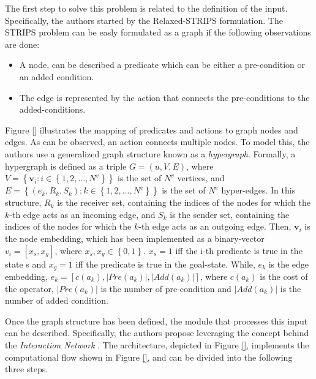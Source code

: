The first step to solve this problem is related to the definition of the input. Specifically, the authors started by the Relaxed-STRIPS formulation. The STRIPS problem can be easly formulated as a graph if the following observations are done:
\begin{itemize}
    \item A node, can be described a predicate which can be either a pre-condition or an added condition.
    \item The edge is represented by the action that connects the pre-conditions to the added-conditions. 
\end{itemize}
Figure \ref{} illustrates the mapping of predicates and actions to graph nodes and edges. As can be observed, an action connects multiple nodes. To model this, the authors use a generalized graph structure known as a \textit{hypergraph}. Formally, a hypergraph is defined as a triple $G = (u, V, E)$, where $V = \left\{ \textbf{v}_{i}: i \in \left\{1, 2, \dots, N^{v} \right\} \right\}$ is the set of $N^{v}$ vertices, and $E = \left\{ (e_{k}, R_{k}, S_{k}): k \in \left\{1, 2, \dots, N^{e} \right\} \right\}$ is the set of $N^{e}$ hyper-edges. In this structure, $R_{k}$ is the receiver set, containing the indices of the nodes for which the $k$-th edge acts as an incoming edge, and $S_{k}$ is the sender set, containing the indices of the nodes for which the $k$-th edge acts as an outgoing edge. Then, $\textbf{v}_{i}$ is the node embedding, which has been implemented as a binary-vector $v_i = [x_s, x_g]$, where $x_s, x_g \in \left\{0,1\right\}$. $x_s=1$ iff the i-th predicate is true in the state s and $x_g=1$ iff the predicate is true in the goal-state. While, $e_{k}$ is the edge embedding, $e_k = [c(a_k), |Pre(a_k)|, |Add(a_k)|]$, where $c(a_k)$ is the cost of the operator, $|Pre(a_k)|$ is the number of pre-condition and $|Add(a_k)|$ is the number of added condition.

Once the graph structure has been defined, the module that processes this input can be described. Specifically, the authors propose leveraging the concept behind the \textit{Interaction Network} \cite{battaglia2016interaction}. The architecture, depicted in Figure \ref{}, implements the computational flow shown in Figure \ref{}, and can be divided into the following three steps.

